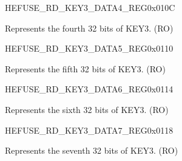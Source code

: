 \begin{register}{H}{EFUSE\_RD\_KEY3\_DATA4\_REG}{0x010C}\label{regdesc:EFUSERDKEY3DATA4REG}
%
\regnewline%
\begin{regdesc}\begin{reglist}
\label{fielddesc:EFUSEKEY3DATA4}\item [EFUSE\_KEY3\_DATA4] Represents the fourth 32 bits of KEY3. (RO)
\end{reglist}\end{regdesc}
\end{register}


\begin{register}{H}{EFUSE\_RD\_KEY3\_DATA5\_REG}{0x0110}\label{regdesc:EFUSERDKEY3DATA5REG}
%
\regnewline%
\begin{regdesc}\begin{reglist}
\label{fielddesc:EFUSEKEY3DATA5}\item [EFUSE\_KEY3\_DATA5] Represents the fifth 32 bits of KEY3. (RO)
\end{reglist}\end{regdesc}
\end{register}


\begin{register}{H}{EFUSE\_RD\_KEY3\_DATA6\_REG}{0x0114}\label{regdesc:EFUSERDKEY3DATA6REG}
%
\regnewline%
\begin{regdesc}\begin{reglist}
\label{fielddesc:EFUSEKEY3DATA6}\item [EFUSE\_KEY3\_DATA6] Represents the sixth 32 bits of KEY3. (RO)
\end{reglist}\end{regdesc}
\end{register}


\begin{register}{H}{EFUSE\_RD\_KEY3\_DATA7\_REG}{0x0118}\label{regdesc:EFUSERDKEY3DATA7REG}
%
\regnewline%
\begin{regdesc}\begin{reglist}
\label{fielddesc:EFUSEKEY3DATA7}\item [EFUSE\_KEY3\_DATA7] Represents the seventh 32 bits of KEY3. (RO)
\end{reglist}\end{regdesc}
\end{register}


